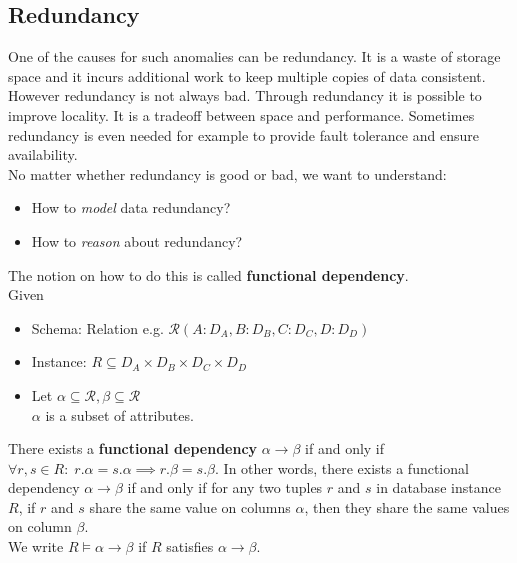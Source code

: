 \subsection{Redundancy}
One of the causes for such anomalies can be redundancy. It is a waste of storage space and it incurs additional work to keep multiple copies of data consistent. However redundancy is not always bad. Through redundancy it is possible to improve locality. It is a tradeoff between space and performance. Sometimes redundancy is even needed for example to provide fault tolerance and ensure availability.\\
No matter whether redundancy is good or bad, we want to understand:
\begin{itemize}
\item How to \textit{model} data redundancy?
\item How to \textit{reason} about redundancy?
\end{itemize}
The notion on how to do this is called \textbf{functional dependency}.
\vspace{.4cm}\\
Given\begin{itemize}
\item Schema: Relation e.g. $\mathcal{R}(A:D_A, B:D_B, C:D_C, D:D_D)$
\item Instance: $R\subseteq D_A \times D_B \times D_C \times D_D$
\item Let $\alpha \subseteq \mathcal{R}, \beta \subseteq \mathcal{R}$\\
$\alpha$ is a subset of attributes.
\end{itemize}
There exists a \textbf{functional dependency} $\alpha \to \beta$ if and only if $\forall r, s \in R:\;r.\alpha = s.\alpha \implies r.\beta = s.\beta$. In other words, there exists a functional dependency $\alpha \to \beta$ if and only if for any two tuples $r$ and $s$ in database instance $R$, if $r$ and $s$ share the same value on columns $\alpha$, then they share the same values on column $\beta$. \\
We write $R \models \alpha \to \beta$ if $R$ satisfies $\alpha \to \beta$.

